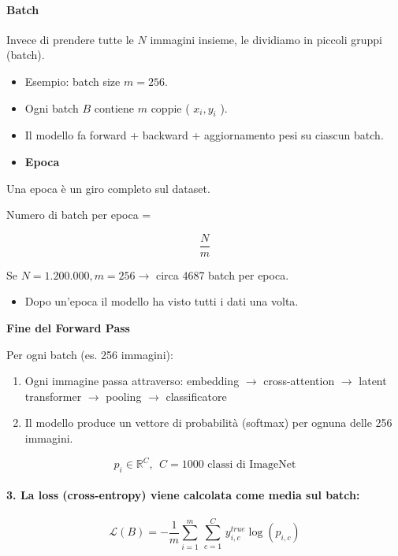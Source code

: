 \documentclass[
  11pt,
]{article}
\begin{document}
\paragraph{Batch}


Invece di prendere tutte le \(N\) immagini insieme, le dividiamo in
piccoli gruppi (batch).


\begin{itemize}
\item
  Esempio: batch size \(m = 256\).
\item
  Ogni batch \(B\) contiene \(m\) coppie ( \(x_{i},y_{i}\) ).
\item
  Il modello fa forward + backward + aggiornamento pesi su ciascun
  batch.
\item
  \textbf{Epoca}
\end{itemize}


Una epoca è un giro completo sul dataset.


Numero di batch per epoca =


\[\frac{N}{m}\]

Se \(N = 1.200.000,m = 256 \rightarrow\) circa 4687 batch per epoca.


\begin{itemize}
\item
  Dopo un'epoca il modello ha visto tutti i dati una
  volta.
\end{itemize}

\textbf{Fine del Forward Pass}

Per ogni batch (es. 256 immagini):

\begin{enumerate}
\def\labelenumi{\arabic{enumi}.}
\item
  Ogni immagine passa attraverso: embedding \(\rightarrow\)
  cross-attention \(\rightarrow\) latent transformer \(\rightarrow\)
  pooling \(\rightarrow\) classificatore
\item
  Il modello produce un vettore di probabilità (softmax) per ognuna
  delle 256 immagini.
\end{enumerate}

\[p_{i} \in \mathbb{R}^{C},\ \ C = 1000\text{ classi di ImageNet}\]

\paragraph{3. La loss (cross-entropy) viene calcolata come media sul batch:}

\[\mathcal{L}(B) = - \frac{1}{m}\sum_{i = 1}^{m}\,\sum_{c = 1}^{C}\, y_{i,c}^{true}\log\left( p_{i,c} \right)\]
\end{document}
